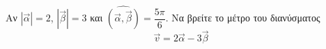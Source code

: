 \documentclass{../../presentation}
\begin{document}






\begin{askisi}
  Αν $|\vec{α}|=2$, $|\vec{β}|=3$ και $\widehat{(\vec{α }, \vec{β })}=\dfrac{5\pi}{6}$. Να βρείτε το μέτρο του διανύσματος
  $$\vec{v}=2\vec{α}-3\vec{β}$$

\end{askisi}



\end{document}
